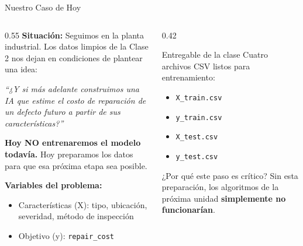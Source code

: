 \documentclass[aspectratio=169]{beamer}
\newcommand{\tech}[1]{\texttt{\textcolor{mainColor}{#1}}}
\begin{document}
\begin{frame}{Nuestro Caso de Hoy}
  \begin{columns}[T]
    \begin{column}{0.55\textwidth}
      \small
      \textbf{Situación:} Seguimos en la planta industrial. Los datos limpios de la Clase 2 nos dejan en condiciones de plantear una idea:

      \vspace{0.15cm}
      \textit{``¿Y si más adelante construimos una IA que estime el costo de reparación de un defecto futuro a partir de sus características?''}

      \vspace{0.2cm}
      \textbf{Hoy NO entrenaremos el modelo todavía.} Hoy preparamos los datos para que esa próxima etapa sea posible.

      \vspace{0.2cm}
      \textbf{Variables del problema:}
      \begin{itemize}\setlength\itemsep{2pt}
        \item Características (X): tipo, ubicación, severidad, método de inspección
        \item Objetivo (y): \tech{repair\_cost}
      \end{itemize}
    \end{column}
    \begin{column}{0.42\textwidth}
      \begin{conceptbox}{\faFileExport\enspace Entregable de la clase}
        \small
        Cuatro archivos CSV listos para entrenamiento:
        \vspace{4pt}
        \begin{itemize}\setlength\itemsep{2pt}
          \item \tech{X\_train.csv}
          \item \tech{y\_train.csv}
          \item \tech{X\_test.csv}
          \item \tech{y\_test.csv}
        \end{itemize}
      \end{conceptbox}
      \vspace{0.15cm}
      \begin{alertblock}{\faIndustry\enspace ¿Por qué este paso es crítico?}
        \small\centering
        Sin esta preparación, los algoritmos de la próxima unidad \textbf{simplemente no funcionarían}.
      \end{alertblock}
    \end{column}
  \end{columns}
\end{frame}
\end{document}
